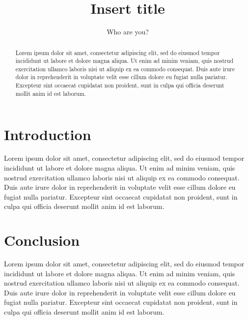 \documentclass[a4paper,12pt]{report}
\title{Insert title}
\author{Who are you?}
\begin{document}
\maketitle
\begin{abstract}
Lorem ipsum dolor sit amet, consectetur adipiscing elit, sed do eiusmod tempor incididunt ut labore et dolore magna aliqua. Ut enim ad minim veniam, quis nostrud exercitation ullamco laboris nisi ut aliquip ex ea commodo consequat. Duis aute irure dolor in reprehenderit in voluptate velit esse cillum dolore eu fugiat nulla pariatur. Excepteur sint occaecat cupidatat non proident, sunt in culpa qui officia deserunt mollit anim id est laborum.
\end{abstract}
\tableofcontents
\setlength{\parindent}{1.5em}
\chapter{Introduction}
Lorem ipsum dolor sit amet, consectetur adipiscing elit, sed do eiusmod tempor incididunt ut labore et dolore magna aliqua. Ut enim ad minim veniam, quis nostrud exercitation ullamco laboris nisi ut aliquip ex ea commodo consequat. Duis aute irure dolor in reprehenderit in voluptate velit esse cillum dolore eu fugiat nulla pariatur. Excepteur sint occaecat cupidatat non proident, sunt in culpa qui officia deserunt mollit anim id est laborum.
\chapter{Conclusion }
Lorem ipsum dolor sit amet, consectetur adipiscing elit, sed do eiusmod tempor incididunt ut labore et dolore magna aliqua. Ut enim ad minim veniam, quis nostrud exercitation ullamco laboris nisi ut aliquip ex ea commodo consequat. Duis aute irure dolor in reprehenderit in voluptate velit esse cillum dolore eu fugiat nulla pariatur. Excepteur sint occaecat cupidatat non proident, sunt in culpa qui officia deserunt mollit anim id est laborum.


 
\end{document}
